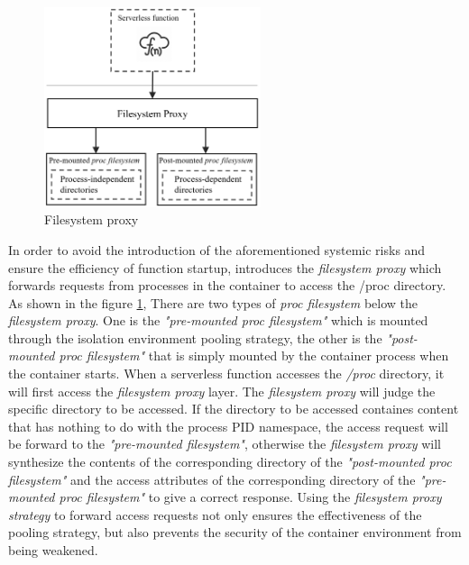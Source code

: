 \begin{figure}[t]
    \centering
    \includegraphics[width=2.5in]{images/fs-proxy.PNG}
    \caption{Filesystem proxy}
    \label{fs-proxy}
\end{figure}
In order to avoid the introduction of the aforementioned systemic risks and ensure the efficiency of function startup, 
\pname introduces the \textit{filesystem proxy} 
which forwards requests from processes in the container to access the /proc directory. 
As shown in the figure \ref{fs-proxy}, 
There are two types of \textit{proc filesystem} below the \textit{filesystem proxy}. 
One is the \textit{"pre-mounted proc filesystem"} which is mounted through the isolation environment pooling strategy, 
the other is the \textit{"post-mounted proc filesystem"} that is simply mounted by the container process when the container starts. 
When a serverless function accesses the \textit{/proc} directory, 
it will first access the \textit{filesystem proxy} layer. 
The \textit{filesystem proxy} will judge the specific directory to be accessed. 
If the directory to be accessed containes content that has nothing to do with the process PID namespace, 
the access request will be forward to the \textit{"pre-mounted filesystem"}, 
otherwise the \textit{filesystem proxy} will synthesize the contents of the corresponding directory of the \textit{"post-mounted proc filesystem"} 
and the access attributes of the corresponding directory of the \textit{"pre-mounted proc filesystem"} to give a correct response. 
Using the \textit{filesystem proxy strategy} to forward access requests not only ensures the effectiveness of the pooling strategy, 
but also prevents the security of the container environment from being weakened.

